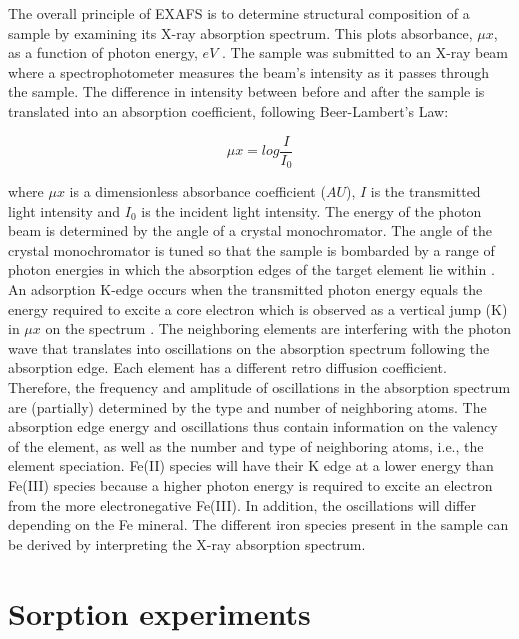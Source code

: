 The overall principle of EXAFS is to determine structural composition of a sample by examining its X-ray absorption spectrum. This plots absorbance, $\mu x$, as a function of photon energy, $eV$ \citep{vlaica2004exafs}. The sample was submitted to an X-ray beam where a spectrophotometer measures the beam's intensity as it passes through the sample. The difference in intensity between before and after the sample is translated into an absorption coefficient, following Beer-Lambert's Law: 

\begin{equation}\label{eq:absorbance}
    \mu x = log \frac{I}{I_0}
\end{equation}

where $\mu x$ is a dimensionless absorbance coefficient ($AU$), $I$ is the transmitted light intensity and $I_0$ is the incident light intensity. The energy of the photon beam is determined by the angle of a crystal monochromator. The angle of the crystal monochromator is tuned so that the sample is bombarded by a range of photon energies in which the absorption edges of the target element lie within \citep{vlaica2004exafs}. An adsorption K-edge occurs when the transmitted photon energy equals the energy required to excite a core electron which is observed as a vertical jump (K) in $\mu x$ on the spectrum \citep{vlaica2004exafs}. The neighboring elements are interfering with the photon wave that translates into oscillations on the absorption spectrum following the absorption edge. Each element has a different retro diffusion coefficient. Therefore, the frequency and amplitude of oscillations in the absorption spectrum are (partially) determined by the type and number of neighboring atoms. The absorption edge energy and oscillations thus contain information on the valency of the element, as well as the number and type of neighboring atoms, i.e., the element speciation. Fe(II) species will have their K edge at a lower energy than Fe(III) species because a higher photon energy is required to excite an electron from the more electronegative Fe(III). In addition, the oscillations will differ depending on the Fe mineral. The different iron species present in the sample can be derived by interpreting the X-ray absorption spectrum.


\section{Sorption experiments}
